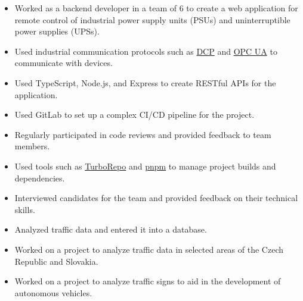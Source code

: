 \documentclass[10pt,a4paper,ragged2e,withhyper]{altacv}
\begin{document}


\makecvheader
\vspace{1cm}

\begin{paracol}{2}

	\begin{itemize}
		\item Worked as a backend developer in a team of 6 to create a web application for remote control of industrial power supply units (PSUs) and uninterruptible power supplies (UPSs).
		\item Used industrial communication protocols such as \href{https://profinetuniversity.com/naming-addressing/profinet-dcp/}{DCP} and \href{https://opcfoundation.org/about/opc-technologies/opc-ua/}{OPC UA} to communicate with devices.
		\item Used TypeScript, Node.js, and Express to create RESTful APIs for the application.
		\item Used GitLab to set up a complex CI/CD pipeline for the project.
		\item Regularly participated in code reviews and provided feedback to team members.
		\item Used tools such as \href{https://turborepo.com/}{TurboRepo} and \href{https://pnpm.io/}{pnpm} to manage project builds and dependencies.
		\item Interviewed candidates for the team and provided feedback on their technical skills.
	\end{itemize}

	\divider

	\begin{itemize}
		\item Analyzed traffic data and entered it into a database.
		\item Worked on a project to analyze traffic data in selected areas of the Czech Republic and Slovakia.
		\item Worked on a project to analyze traffic signs to aid in the development of autonomous vehicles.
	\end{itemize}


\end{paracol}
\end{document}
